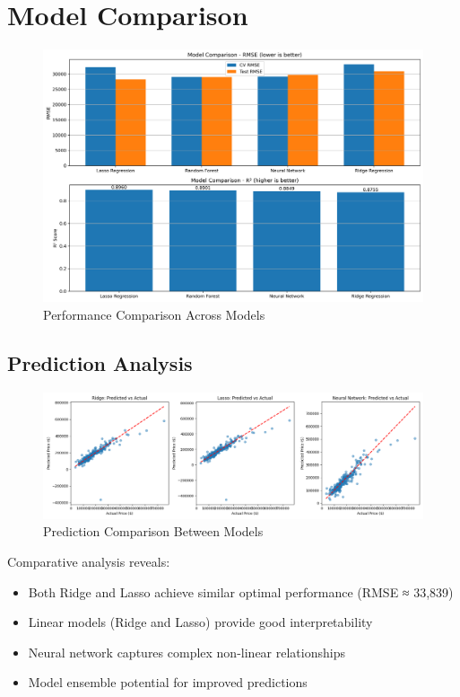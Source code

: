 \section{Model Comparison}
\begin{figure}[H]
    \centering
    \includegraphics[width=1.0\textwidth]{../figures/model_comparison.png}
    \caption{Performance Comparison Across Models}
    \label{fig:model_comparison}
\end{figure}

\subsection{Prediction Analysis}
\begin{figure}[H]
    \centering
    \includegraphics[width=1.0\textwidth]{../prediction_comparison.png}
    \caption{Prediction Comparison Between Models}
    \label{fig:prediction_comparison}
\end{figure}

Comparative analysis reveals:
\begin{itemize}
    \item Both Ridge and Lasso achieve similar optimal performance (RMSE ≈ 33,839)
    \item Linear models (Ridge and Lasso) provide good interpretability
    \item Neural network captures complex non-linear relationships
    \item Model ensemble potential for improved predictions
\end{itemize}

